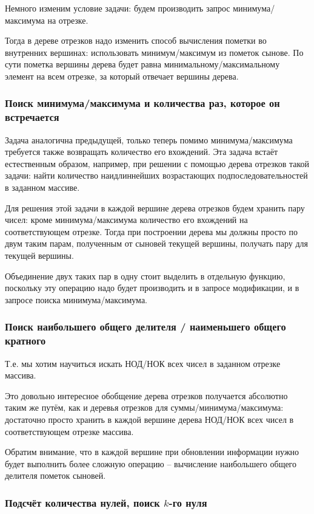 Немного изменим условие задачи: будем производить запрос минимума/максимума на отрезке.

Тогда в дереве отрезков надо изменить способ вычисления пометки во внутренних вершинах: использовать минимум/максимум из пометок сынове. По сути пометка вершины дерева будет равна минимальному/максимальному элемент на всем отрезке, за который отвечает вершины дерева.

\subsubsection{Поиск минимума/максимума и количества раз, которое он встречается}

Задача аналогична предыдущей, только теперь помимо минимума/максимума требуется также возвращать количество его вхождений. Эта задача встаёт естественным образом, например, при решении с помощью дерева отрезков такой задачи: найти количество наидлиннейших возрастающих подпоследовательностей в заданном массиве.

Для решения этой задачи в каждой вершине дерева отрезков будем хранить пару чисел: кроме минимума/максимума количество его вхождений на соответствующем отрезке. Тогда при построении дерева мы должны просто по двум таким парам, полученным от сыновей текущей вершины, получать пару для текущей вершины.

Объединение двух таких пар в одну стоит выделить в отдельную функцию, поскольку эту операцию надо будет производить и в запросе модификации, и в запросе поиска минимума/максимума.

\subsubsection{Поиск наибольшего общего делителя / наименьшего общего кратного}
Т.е. мы хотим научиться искать НОД/НОК всех чисел в заданном отрезке массива.

Это довольно интересное обобщение дерева отрезков получается абсолютно таким же путём, как и деревья отрезков для суммы/минимума/максимума: достаточно просто хранить в каждой вершине дерева НОД/НОК всех чисел в соответствующем отрезке массива.

Обратим внимание, что в каждой вершине при обновлении информации нужно будет выполнить более сложную операцию -- вычисление наибольшего общего делителя пометок сыновей.

\subsubsection{Подсчёт количества нулей, поиск $k$-го нуля}

